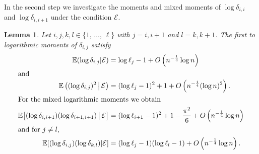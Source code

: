 \documentclass[10pt]{amsart}
\newtheorem{lemm}[theo]{Lemma}\newtheorem{prop}[theo]{Proposition}\newtheorem{coro}[theo]{Corollary}\newtheorem{conj}[theo]{Conjecture}
\theoremstyle{definition}\newtheorem{defi}[theo]{Definition}\newtheorem{rema}[theo]{Remark}\newtheorem{exam}[theo]{Example}\newtheorem{exem}[theo]{Example}\newtheorem{nota}[theo]{Notation}
\newcommand{\bbE}{\mathbb{E}}
\newcommand{\clE}{\mathcal{E}}
\begin{document}
In the second step we investigate the moments and mixed moments of $\log \delta_{i,i}$ and $\log \delta_{i,i+1}$ under the condition $\clE$.

\begin{lemm}\label{lm:distancesmall}
Let $i,j,k,l\in\{1,\,\ldots,\,\ell\}$ with $j=i,i+1$ and $l=k,k+1$. The first to logarithmic moments of $\delta_{i,j}$ satisfy
\begin{align}
\bbE (\log \delta_{i,j} |\clE) &=\log \ell_j -1 + O\left(n^{- \frac 14} \log n\right)\label{eq:E-log-delta}\\
\intertext{and}
\bbE \left((\log \delta_{i,j})^2 \,\middle|\,\clE\right) &=(\log \ell_j-1)^2 + 1 +O\left(n^{- \frac 14}(\log n)^2\right).\label{eq:E-log-delta-sqr}\\
\intertext{For the mixed logarithmic moments we obtain}
\bbE\big[(\log \delta_{i,i+1}) (\log \delta_{i+1,i+1})\,\big|\,\clE\big] &= (\log \ell_{i+1} -1)^2 + 1- \frac {\pi^2}6 + O\left(n^{- \frac 14} \log n\right)
\label{eq:E-log-delta-neighbors}\\
\intertext{and for $j \neq l$,}
\bbE[(\log \delta_{i,j}) (\log \delta_{k,l})|\clE]& = (\log \ell_{j} -1)(\log \ell_{l} -1) + O\left(n^{- \frac 14} \log n\right).
\label{eq:E-log-delta-nonneighbors}
\end{align}
\end{lemm}
\end{document}
